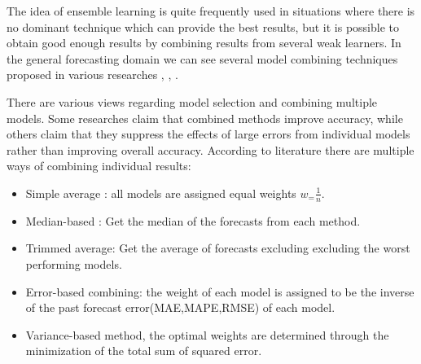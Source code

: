 The idea of ensemble learning is quite frequently used in situations where there is no dominant technique which can provide the best results, but it is possible to obtain good enough results by combining results from several weak learners. In the general forecasting domain we can see several model combining techniques proposed in various researches \cite{Zou_2004}, \cite{Wagner_2011},
\cite{Zhang_2003}.  

There are various views regarding model selection and combining multiple models. Some researches claim that combined methods improve accuracy, while others claim that they suppress the effects of large errors from individual models rather than improving overall accuracy. According to literature there are multiple ways of combining individual results\cite{Adhikari_2012}:

\begin{itemize}
\item Simple average : all models are assigned equal weights $w_=\frac{1}{n}$.
\item Median-based :  Get the median of the forecasts from each method.
\item Trimmed average: Get the average of forecasts excluding  excluding the worst performing models.
\item Error-based combining: the weight of each model is assigned to be the inverse of the past forecast error(MAE,MAPE,RMSE) of each model.
\item Variance-based method, the optimal weights are determined through the minimization of the total sum of squared error.
\end{itemize}
